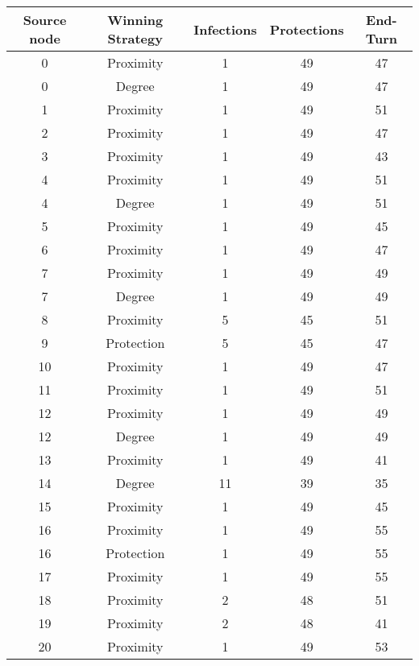 \documentclass[results.tex]{subfiles}
\begin{document}
\begin{center}
  \begin{tabular}{| c || c | c | c | c |}
    \hline
    {\bfseries Source node} & {\bfseries Winning Strategy} & {\bfseries Infections} & {\bfseries Protections} & {\bfseries End-Turn} \\  %
    \hline\hline
    0 & Proximity & 1 & 49 & 47 \\ 
    \hline
    0 & Degree & 1 & 49 & 47 \\ 
    \hline
    1 & Proximity & 1 & 49 & 51 \\ 
    \hline
    2 & Proximity & 1 & 49 & 47 \\ 
    \hline
    3 & Proximity & 1 & 49 & 43 \\ 
    \hline
    4 & Proximity & 1 & 49 & 51 \\ 
    \hline
    4 & Degree & 1 & 49 & 51 \\ 
    \hline
    5 & Proximity & 1 & 49 & 45 \\ 
    \hline
    6 & Proximity & 1 & 49 & 47 \\ 
    \hline
    7 & Proximity & 1 & 49 & 49 \\ 
    \hline
    7 & Degree & 1 & 49 & 49 \\ 
    \hline
    8 & Proximity & 5 & 45 & 51 \\ 
    \hline
    9 & Protection & 5 & 45 & 47 \\ 
    \hline
    10 & Proximity & 1 & 49 & 47 \\ 
    \hline
    11 & Proximity & 1 & 49 & 51 \\ 
    \hline
    12 & Proximity & 1 & 49 & 49 \\ 
    \hline
    12 & Degree & 1 & 49 & 49 \\ 
    \hline
    13 & Proximity & 1 & 49 & 41 \\ 
    \hline
    14 & Degree & 11 & 39 & 35 \\ 
    \hline
    15 & Proximity & 1 & 49 & 45 \\ 
    \hline
    16 & Proximity & 1 & 49 & 55 \\ 
    \hline
    16 & Protection & 1 & 49 & 55 \\ 
    \hline
    17 & Proximity & 1 & 49 & 55 \\ 
    \hline
    18 & Proximity & 2 & 48 & 51 \\ 
    \hline
    19 & Proximity & 2 & 48 & 41 \\ 
    \hline
    20 & Proximity & 1 & 49 & 53 \\ 

\end{tabular}
\end{center}
\end{document}
